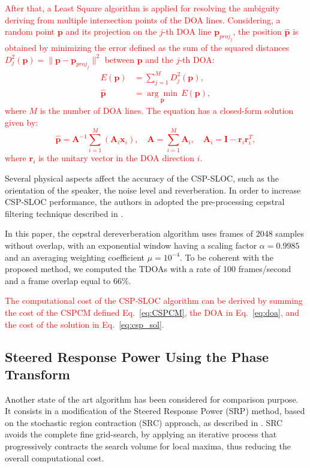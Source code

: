 \documentclass[review]{elsarticle}
\let\originaleqref=\eqref
\renewcommand{\eqref}{Eq.~\originaleqref}
\begin{document}
\textcolor{red}{After that, a Least Square algorithm is applied for resolving the ambiguity deriving from multiple intersection points of the DOA lines.  Considering, a random point $\mathbf{p}$ and its projection on the $j$-th DOA line $\mathbf{p}_{proj_j}$, the position $\hat{\mathbf{p}}$ is obtained by minimizing the error defined as the sum of the squared distances $D^2_j(\mathbf{p}) = \|\mathbf{p}-\mathbf{p}_{proj_j}\|^2$ between $\mathbf{p}$ and the $j$-th DOA:
\begin{align}
E(\mathbf{p}) &= \sum_{j=1}^M D^2_j (\mathbf{p}),\\
\hat{\mathbf{p}} & =  \underset{\mathbf{p}} {\arg \min} \,E(\mathbf{p}), \label{eq:ls}
\end{align}
where $M$ is the number of DOA lines. The equation has a closed-form solution given by:
\begin{equation}\label{eq:csp_sol}
\hat{\mathbf{p}} = \mathbf{A}^{-1} \sum_{i=1}^M (\mathbf{A}_i\mathbf{x}_i), \quad \mathbf{A} = \sum_{i=1}^M\mathbf{A}_i, \quad \mathbf{A}_i=\mathbf{I}-\mathbf{r}_i \mathbf{r}_i^T,
\end{equation}
where $\mathbf{r}_i$ is the unitary vector in the DOA direction $i$.}

Several physical aspects affect the accuracy of the CSP-SLOC, such as the orientation of the speaker, the noise level and reverberation. In order to increase CSP-SLOC performance, the authors in \cite{tsiami2014experiments} adopted the pre-processing cepstral filtering technique described in \cite{stephenne1997new}. 

In this paper, the cepstral dereverberation algorithm uses frames of 2048 samples without overlap, with an exponential window having a scaling factor $\alpha = 0.9985$ and an averaging weighting coefficient $\mu=10^{-4}$. To be coherent with the proposed method, we computed the TDOAs with a rate of 100 frames/second and a frame overlap equal to 66\%.

\textcolor{red}{The computational cost of the CSP-SLOC algorithm can be derived by summing the cost of the CSPCM defined \eqref{eq:CSPCM}, the DOA in \eqref{eq:doa}, and the cost of the solution in \eqref{eq:csp_sol}.}


\subsection{Steered Response Power Using the Phase Transform}
Another state of the art algorithm has been considered for comparison purpose. It consists in a modification of the Steered Response Power (SRP) method, based on the stochastic region contraction (SRC) approach, as described in \cite{DoSY07}. SRC avoids the complete fine grid-search, by applying an iterative process that progressively contracts the search volume for local maxima, thus reducing the overall computational cost.
\end{document}
